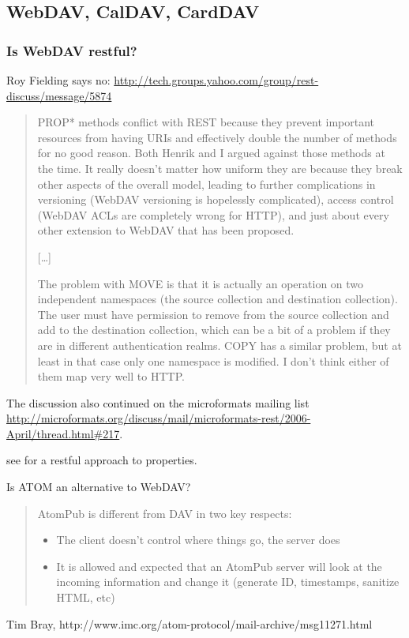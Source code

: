 \documentclass[12pt,a4paper]{scrartcl}		%
\begin{document}
\subsection{WebDAV, CalDAV, CardDAV}

\subsubsection{Is WebDAV restful?}

Roy Fielding says no: \url{http://tech.groups.yahoo.com/group/rest-discuss/message/5874}

\begin{quotation}
PROP* methods conflict with REST because they prevent
important resources from having URIs and effectively double the
number of methods for no good reason. Both Henrik and I argued
against those methods at the time. It really doesn't matter
how uniform they are because they break other aspects of the
overall model, leading to further complications in versioning
(WebDAV versioning is hopelessly complicated), access control
(WebDAV ACLs are completely wrong for HTTP), and just about every
other extension to WebDAV that has been proposed.

[\ldots]

The problem with MOVE is that it is actually an operation on two
independent namespaces (the source collection and destination
collection). The user must have permission to remove from the
source collection and add to the destination collection, which
can be a bit of a problem if they are in different authentication
realms. COPY has a similar problem, but at least in that case
only one namespace is modified. I don't think either of them map
very well to HTTP.
\end{quotation}

The discussion also continued on the microformats mailing list
\url{http://microformats.org/discuss/mail/microformats-rest/2006-April/thread.html#217}.

see \cite{Amundsen2010} for a restful approach to properties.

Is ATOM an alternative to WebDAV?

\begin{quote}
  AtomPub is different from DAV in two key respects:
  \begin{itemize}
  \item The client doesn't control where things go, the server does
  \item It is allowed and expected that an AtomPub server will look at the incoming information and change it (generate ID, timestamps, sanitize HTML, etc)
  \end{itemize}
\end{quote}
Tim Bray, http://www.imc.org/atom-protocol/mail-archive/msg11271.html
\end{document}

